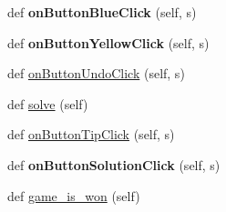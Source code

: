 \begin{DoxyCompactItemize}
def {\bfseries on\+Button\+Blue\+Click} (self, s)
\item 
\mbox{\label{classGUIController_1_1MainWindow_a4a6c2192bf869228b7959e85eb39329f}} 
def {\bfseries on\+Button\+Yellow\+Click} (self, s)
\item 
def \hyperlink{classGUIController_1_1MainWindow_a68b891f21fd322728889657173560a64}{on\+Button\+Undo\+Click} (self, s)
\item 
def \hyperlink{classGUIController_1_1MainWindow_a393caaf3fa3cd4840a2ac525bf0df9ab}{solve} (self)
\item 
def \hyperlink{classGUIController_1_1MainWindow_a73d640271043cd4917efd0780679b96d}{on\+Button\+Tip\+Click} (self, s)
\item 
\mbox{\label{classGUIController_1_1MainWindow_a0a8fbf299a7f6054665227b51dd9bd34}} 
def {\bfseries on\+Button\+Solution\+Click} (self, s)
\item 
def \hyperlink{classGUIController_1_1MainWindow_af7ba8782708a3a573f5ecd12f7762e81}{game\+\_\+is\+\_\+won} (self)
\end{DoxyCompactItemize}
